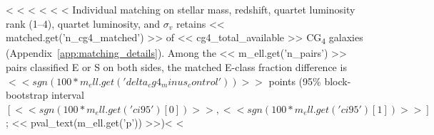 \documentclass{aa}
\newcommand{\CG}{CG\textsubscript{4}}
\begin{document}
<%
<%
<%
<%
<%
<%
Individual matching on stellar mass, redshift, quartet luminosity rank (1--4), quartet luminosity, and \(\sigma_v\) retains << matched.get('n_cg4_matched') >> of << cg4_total_available >> \CG{} galaxies (Appendix~\ref{app:matching_details}). Among the << m_ell.get('n_pairs') >> pairs classified E or S on both sides, the matched E-class fraction difference is \(<< sgn(100 * m_ell.get('delta_cg4_minus_control')) >>\) points (95\% block-bootstrap interval \([<< sgn(100 * m_ell.get('ci95')[0]) >>, << sgn(100 * m_ell.get('ci95')[1]) >>]\); << pval_text(m_ell.get('p')) >>)<%
<%
\end{document}
